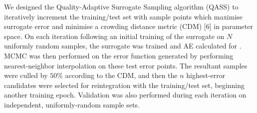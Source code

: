 We designed the Quality-Adaptive Surrogate Sampling algorithm (QASS) to iteratively increment the training/test set with sample points which maximise surrogate error and minimise a crowding distance metric (CDM) [6] in parameter space. On each iteration following an initial training of the surrogate on $N$ uniformly random samples, the surrogate was trained and AE calculated for . MCMC was then performed on the error function generated by performing nearest-neighbor interpolation on these test error points. The resultant samples were culled by $50\%$ according to the CDM, and then the $n$ highest-error candidates were selected for reintegration with the training/test set, beginning another training epoch. Validation was also performed during each iteration on independent, uniformly-random sample sets.



